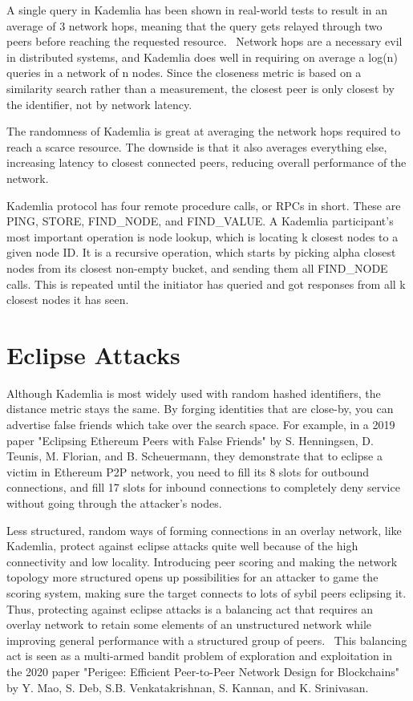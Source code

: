 A single query in Kademlia has been shown in real-world tests to result in an average of 3 network hops, meaning that the query gets relayed through two peers before reaching the requested resource.~\cite{Roos2013-mb} Network hops are a necessary evil in distributed systems, and Kademlia does well in requiring on average a log(n) queries in a network of n nodes. Since the closeness metric is based on a similarity search rather than a measurement, the closest peer is only closest by the identifier, not by network latency.~\cite{Eigenmann2020-zm}

The randomness of Kademlia is great at averaging the network hops required to reach a scarce resource. The downside is that it also averages everything else, increasing latency to closest connected peers, reducing overall performance of the network.

Kademlia protocol has four remote procedure calls, or RPCs in short. These are PING, STORE, FIND\_NODE, and FIND\_VALUE. A Kademlia participant's most important operation is node lookup, which is locating k closest nodes to a given node ID. It is a recursive operation, which starts by picking alpha closest nodes from its closest non-empty bucket, and sending them all FIND\_NODE calls. This is repeated until the initiator has queried and got responses from all k closest nodes it has seen.

\section{Eclipse Attacks}
Although Kademlia is most widely used with random hashed identifiers, the distance metric stays the same. By forging identities that are close-by, you can advertise false friends which take over the search space. For example, in a 2019 paper "Eclipsing Ethereum Peers with False Friends" by S. Henningsen, D. Teunis, M. Florian, and B. Scheuermann, they demonstrate that to eclipse a victim in Ethereum P2P network, you need to fill its 8 slots for outbound connections, and fill 17 slots for inbound connections to completely deny service without going through the attacker's nodes.~\cite{Henningsen2019-mf}

Less structured, random ways of forming connections in an overlay network, like Kademlia, protect against eclipse attacks quite well because of the high connectivity and low locality. Introducing peer scoring and making the network topology more structured opens up possibilities for an attacker to game the scoring system, making sure the target connects to lots of sybil peers eclipsing it. Thus, protecting against eclipse attacks is a balancing act that requires an overlay network to retain some elements of an unstructured network while improving general performance with a structured group of peers.~\cite{Mao2020-ee} This balancing act is seen as a multi-armed bandit problem of exploration and exploitation in the 2020 paper "Perigee: Efficient Peer-to-Peer Network Design for Blockchains" by Y. Mao, S. Deb, S.B. Venkatakrishnan, S. Kannan, and K. Srinivasan.


